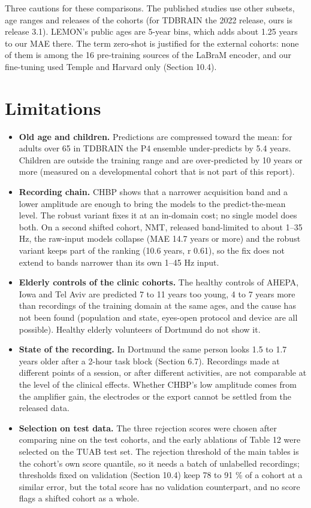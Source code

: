 \documentclass[11pt,a4paper]{article}
\begin{document}
Three cautions for these comparisons. The published studies use other subsets, age ranges and releases of the cohorts (for TDBRAIN the 2022 release, ours is release 3.1). LEMON's public ages are 5-year bins, which adds about 1.25 years to our MAE there. The term zero-shot is justified for the external cohorts: none of them is among the 16 pre-training sources of the LaBraM encoder, and our fine-tuning used Temple and Harvard only (Section 10.4).

\section{Limitations}

\begin{itemize}
\item \textbf{Old age and children.} Predictions are compressed toward the mean: for adults over 65 in TDBRAIN the P4 ensemble under-predicts by 5.4 years. Children are outside the training range and are over-predicted by 10 years or more (measured on a developmental cohort that is not part of this report).
\item \textbf{Recording chain.} CHBP shows that a narrower acquisition band and a lower amplitude are enough to bring the models to the predict-the-mean level. The robust variant fixes it at an in-domain cost; no single model does both. On a second shifted cohort, NMT, released band-limited to about 1--35 Hz, the raw-input models collapse (MAE 14.7 years or more) and the robust variant keeps part of the ranking (10.6 years, r 0.61), so the fix does not extend to bands narrower than its own 1--45 Hz input.
\item \textbf{Elderly controls of the clinic cohorts.} The healthy controls of AHEPA, Iowa and Tel Aviv are predicted 7 to 11 years too young, 4 to 7 years more than recordings of the training domain at the same ages, and the cause has not been found (population and state, eyes-open protocol and device are all possible). Healthy elderly volunteers of Dortmund do not show it.
\item \textbf{State of the recording.} In Dortmund the same person looks 1.5 to 1.7 years older after a 2-hour task block (Section 6.7). Recordings made at different points of a session, or after different activities, are not comparable at the level of the clinical effects. Whether CHBP's low amplitude comes from the amplifier gain, the electrodes or the export cannot be settled from the released data.
\item \textbf{Selection on test data.} The three rejection scores were chosen after comparing nine on the test cohorts, and the early ablations of Table 12 were selected on the TUAB test set. The rejection threshold of the main tables is the cohort's own score quantile, so it needs a batch of unlabelled recordings; thresholds fixed on validation (Section 10.4) keep 78 to 91 \% of a cohort at a similar error, but the total score has no validation counterpart, and no score flags a shifted cohort as a whole.

\end{itemize}
\end{document}
